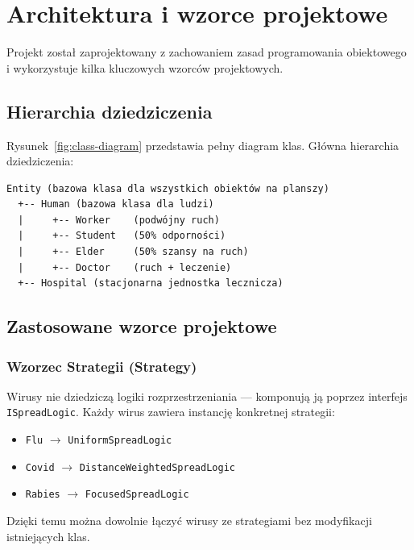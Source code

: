 \documentclass[a4paper,12pt]{article}
\begin{document}
\section{Architektura i wzorce projektowe}

Projekt został zaprojektowany z zachowaniem zasad programowania obiektowego i wykorzystuje
kilka kluczowych wzorców projektowych.

\subsection{Hierarchia dziedziczenia}

Rysunek~\ref{fig:class-diagram} przedstawia pełny diagram klas. Główna hierarchia dziedziczenia:

\begin{center}
\begin{lstlisting}[frame=none, numbers=none, basicstyle=\ttfamily\small]
Entity (bazowa klasa dla wszystkich obiektów na planszy)
  +-- Human (bazowa klasa dla ludzi)
  |     +-- Worker    (podwójny ruch)
  |     +-- Student   (50% odporności)
  |     +-- Elder     (50% szansy na ruch)
  |     +-- Doctor    (ruch + leczenie)
  +-- Hospital (stacjonarna jednostka lecznicza)
\end{lstlisting}
\end{center}

\subsection{Zastosowane wzorce projektowe}

\subsubsection{Wzorzec Strategii (Strategy)}

Wirusy nie dziedziczą logiki rozprzestrzeniania --- komponują ją poprzez interfejs
\texttt{ISpreadLogic}. Każdy wirus zawiera instancję konkretnej strategii:

\begin{itemize}
    \item \texttt{Flu} $\rightarrow$ \texttt{UniformSpreadLogic}
    \item \texttt{Covid} $\rightarrow$ \texttt{DistanceWeightedSpreadLogic}
    \item \texttt{Rabies} $\rightarrow$ \texttt{FocusedSpreadLogic}
\end{itemize}

Dzięki temu można dowolnie łączyć wirusy ze strategiami bez modyfikacji istniejących klas.
\end{document}
